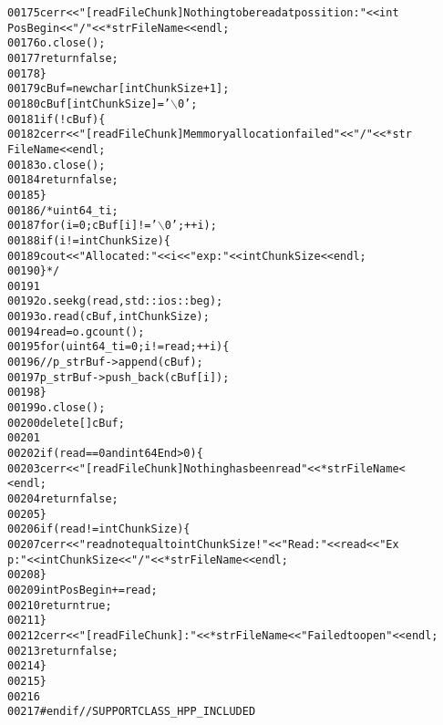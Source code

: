 \begin{footnotesize}
\begin{alltt}
00175                     cerr<<\textcolor{stringliteral}{"[readFileChunk] Nothing to be read at possition:"}<<int
      PosBegin<<\textcolor{stringliteral}{"/ "}<<*strFileName<<endl;
00176                     o.close();
00177                     \textcolor{keywordflow}{return} \textcolor{keyword}{false};
00178                 \}
00179                 cBuf = \textcolor{keyword}{new} \textcolor{keywordtype}{char}[intChunkSize+1];
00180                 cBuf[intChunkSize] = \textcolor{charliteral}{'\(\backslash\)0'};
00181                 \textcolor{keywordflow}{if}(!cBuf)\{
00182                     cerr<<\textcolor{stringliteral}{"[readFileChunk] Memmory allocation failed"}<<\textcolor{stringliteral}{"/ "}<<*str
      FileName<<endl;
00183                     o.close();
00184                     \textcolor{keywordflow}{return} \textcolor{keyword}{false};
00185                 \}
00186                 \textcolor{comment}{/*uint64\_t i;}
00187 \textcolor{comment}{                for(i=0; cBuf[i]!='\(\backslash\)0'; ++i);}
00188 \textcolor{comment}{                if (i!=intChunkSize)\{}
00189 \textcolor{comment}{                    cout<<"Allocated:"<<i<<" exp:"<<intChunkSize<<endl;}
00190 \textcolor{comment}{                \}*/}
00191 
00192                 o.seekg(read,std::ios::beg);
00193                 o.read(cBuf,intChunkSize);
00194                 read = o.gcount();
00195                 \textcolor{keywordflow}{for}(uint64\_t i=0; i!=read; ++i)\{
00196                 \textcolor{comment}{//p\_strBuf->append(cBuf);}
00197                     p\_strBuf->push\_back(cBuf[i]);
00198                 \}
00199                 o.close();
00200                 \textcolor{keyword}{delete}[] cBuf;
00201 
00202                 \textcolor{keywordflow}{if} (read == 0 and int64End > 0)\{
00203                     cerr<<\textcolor{stringliteral}{"[readFileChunk] Nothing has been read "}<<*strFileName<
      <endl;
00204                     \textcolor{keywordflow}{return} \textcolor{keyword}{false};
00205                 \}
00206                 \textcolor{keywordflow}{if}(read != intChunkSize)\{
00207                     cerr<<\textcolor{stringliteral}{"read not equal to intChunkSize! "}<<\textcolor{stringliteral}{"Read:"}<<read<<\textcolor{stringliteral}{" Ex
      p:"}<<intChunkSize<<\textcolor{stringliteral}{"/ "}<<*strFileName<<endl;
00208                 \}
00209                 intPosBegin += read;
00210                 \textcolor{keywordflow}{return} \textcolor{keyword}{true};
00211             \}
00212             cerr<<\textcolor{stringliteral}{"[readFileChunk]: "}<<*strFileName<<\textcolor{stringliteral}{" Failed to open"}<<endl;
00213             \textcolor{keywordflow}{return} \textcolor{keyword}{false};
00214     \}
00215 \}
00216 
00217 \textcolor{preprocessor}{#endif // SUPPORTCLASS\_HPP\_INCLUDED}
\end{alltt}\end{footnotesize}
